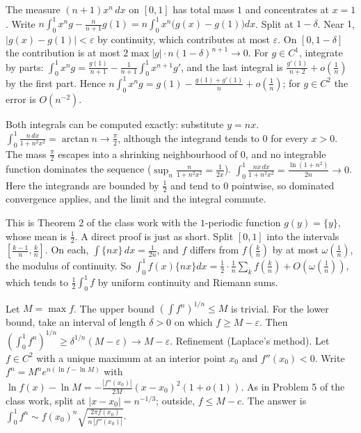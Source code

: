 \documentclass[11pt,a4paper]{article}
\begin{document}

 The measure $(n+1)x^n\,dx$ on $[0,1]$ has total mass $1$ and concentrates at $x=1$. Write $n\int_0^1x^ng-\frac{n}{n+1}g(1)=n\int_0^1x^n\bigl(g(x)-g(1)\bigr)dx$.
 Split at $1-\delta$. Near $1$, $|g(x)-g(1)|<\varepsilon$ by continuity, which contributes at most $\varepsilon$. On $[0,1-\delta]$ the contribution is at most $2\max|g|\cdot n(1-\delta)^{n+1}\to0$.
 For $g\in C^1$, integrate by parts: $\int_0^1x^ng=\frac{g(1)}{n+1}-\frac1{n+1}\int_0^1x^{n+1}g'$, and the last integral is $\frac{g'(1)}{n+2}+o(\frac1n)$ by the first part. Hence $n\int_0^1x^ng=g(1)-\frac{g(1)+g'(1)}{n}+o(\frac1n)$; for $g\in C^2$ the error is $O(n^{-2})$.

 Both integrals can be computed exactly: substitute $y=nx$.
 $\int_0^1\frac{n\,dx}{1+n^2x^2}=\arctan n\to\frac\pi2$, although the integrand tends to $0$ for every $x>0$. The mass $\frac\pi2$ escapes into a shrinking neighbourhood of $0$, and no integrable function dominates the sequence ($\sup_n\frac{n}{1+n^2x^2}=\frac1{2x}$).
 $\int_0^1\frac{nx\,dx}{1+n^2x^2}=\frac{\ln(1+n^2)}{2n}\to0$. Here the integrands are bounded by $\frac12$ and tend to $0$ pointwise, so dominated convergence applies, and the limit and the integral commute.

 This is Theorem 2 of the class work with the $1$-periodic function $g(y)=\{y\}$, whose mean is $\frac12$. A direct proof is just as short.
 Split $[0,1]$ into the intervals $[\frac{k-1}n,\frac kn]$. On each, $\int\{nx\}\,dx=\frac1{2n}$, and $f$ differs from $f(\frac kn)$ by at most $\omega(\frac1n)$, the modulus of continuity.
 So $\int_0^1f(x)\{nx\}dx=\frac12\cdot\frac1n\sum_kf(\frac kn)+O(\omega(\frac1n))$, which tends to $\frac12\int_0^1f$ by uniform continuity and Riemann sums.

 Let $M=\max f$. The upper bound $(\int f^n)^{1/n}\le M$ is trivial. For the lower bound, take an interval of length $\delta>0$ on which $f\ge M-\varepsilon$.
 Then $(\int_0^1f^n)^{1/n}\ge\delta^{1/n}(M-\varepsilon)\to M-\varepsilon$.
 Refinement (Laplace's method). Let $f\in C^2$ with a unique maximum at an interior point $x_0$ and $f''(x_0)<0$. Write $f^n=M^ne^{n(\ln f-\ln M)}$ with $\ln f(x)-\ln M=-\frac{|f''(x_0)|}{2M}(x-x_0)^2(1+o(1))$. As in Problem 5 of the class work, split at $|x-x_0|=n^{-1/3}$; outside, $f\le M-c$.
 The answer is $\int_0^1f^n\sim f(x_0)^n\sqrt{\frac{2\pi f(x_0)}{n\,|f''(x_0)|}}$.
\end{document}
